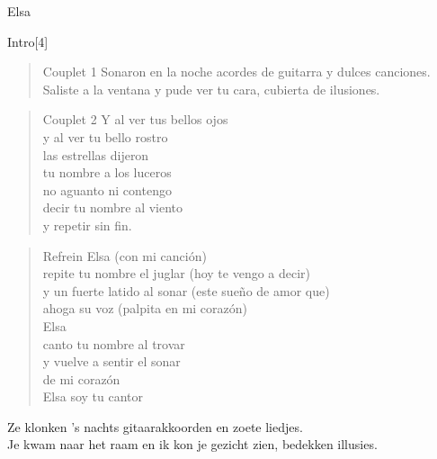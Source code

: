 \begin{song}[tango]{Elsa}
\begin{instrumental}{Intro}[4]
 \measure{}  \measure{}
 \measure{}  \measure{}
 \measure{}  \measure{}
 \measure{} 
\end{instrumental}

\begin{verse}{Couplet 1}
Sonaron en la noche 
acordes de guitarra 
y dulces canciones.\\
Saliste a la ventana 
y pude ver tu cara, 
cubierta de ilusiones.
\end{verse}

\begin{verse}{Couplet 2}
Y al ver tus bellos ojos\\
y al ver tu bello rostro\\
las estrellas dijeron \\
tu nombre a los luceros\\
no aguanto ni contengo\\
decir tu nombre al viento\\
y repetir sin fin.
\end{verse}


\begin{verse}{Refrein}
Elsa   (con mi canción)\\
repite tu nombre el juglar  (hoy te vengo a decir)\\
y un fuerte latido al sonar  (este sueño de amor que)\\
ahoga su voz   (palpita en mi corazón)\\
  
Elsa\\
canto tu nombre al trovar\\
y vuelve a sentir el sonar\\
de mi corazón\\

Elsa soy tu cantor
\end{verse}

\clearpage
\begin{translation}
Ze klonken 's nachts gitaarakkoorden en zoete liedjes.\\
Je kwam naar het raam en ik kon je gezicht zien, bedekken illusies.\vspace{\wlskip}


\end{translation}
\end{song}
